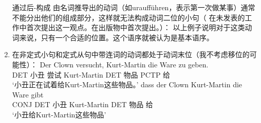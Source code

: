 \begin{enumerate}
通过后-构成 由名词推导出的动词（如uraufführen，表示第一次做某事）通常不能分出他们的组成部分，这样就无法构成动词二位的小句（\citet{Hoehle91b} 在未发表的工作中首次提出这一观点。在出版物中首次提出。）：
\eal
{}
\zl
以上例子说明对于这类动词来说，只有一个合适的位置。这个语序就被认为是基本语序。
\item 在非定式小句和定式从句中带连词的动词都处于动词末位（我不考虑移位的可能性）：
\eal
\ex 
\gll Der Clown versucht, Kurt-Martin die Ware zu geben.\\
     DET 小丑 尝试 Kurt-Martin DET 物品 PCTP 给\\
\glt `小丑正在试着给Kurt-Martin这些物品。'
\ex 
\gll dass der Clown Kurt-Martin die Ware gibt\\
	 CONJ DET 小丑 Kurt-Martin DET 物品 给\\
\glt `小丑给Kurt-Martin这些物品'
\zl


\end{enumerate}
